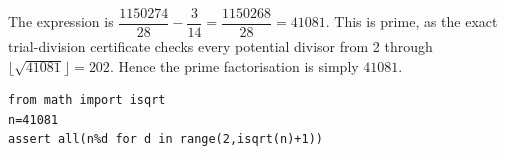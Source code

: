 The expression is $\dfrac{1150274}{28}-\dfrac{3}{14}=\dfrac{1150268}{28}=41081$. This is prime, as the exact trial-division certificate checks every potential divisor from 2 through $\lfloor\sqrt{41081}\rfloor=202$. Hence the prime factorisation is simply $\boxed{41081}$.
\begin{verbatim}
from math import isqrt
n=41081
assert all(n%d for d in range(2,isqrt(n)+1))
\end{verbatim}
